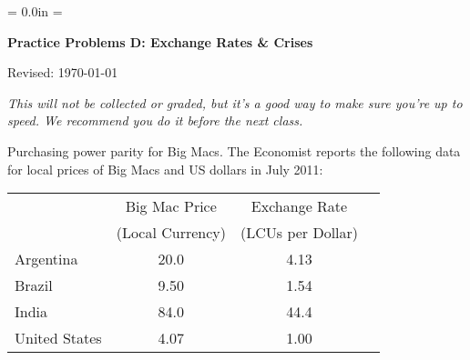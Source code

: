 \documentclass[12pt]{exam}
\def\HeadName{Practice Problems D}
\begin{document}
\parindent = 0.0in
\parskip = \bigskipamount
\thispagestyle{empty}%
\Head

\centerline{\large \bf \HeadName:  Exchange Rates \& Crises}
\centerline{Revised:  \today}

\medskip
{\it This will not be collected or graded,
but it's a good way to make sure you're up to speed.
We recommend you do it before the next class.}


\begin{questions}
\question Purchasing power parity for Big Macs.
The Economist reports the following data for
local prices of Big Macs and US dollars in July 2011:

\begin{center}
\begin{tabular}{lccc}
\toprule
        & Big Mac Price  &  Exchange Rate    \\
        &(Local Currency)&(LCUs per Dollar)   \\
\midrule
Argentina       &  20.0  &  4.13  \\
Brazil          &  9.50  &  1.54 \\
India           &  84.0  &  44.4   \\
United States   &  4.07  &  1.00   \\
\bottomrule
\end{tabular}
\end{center}



\end{questions}
\end{document}
